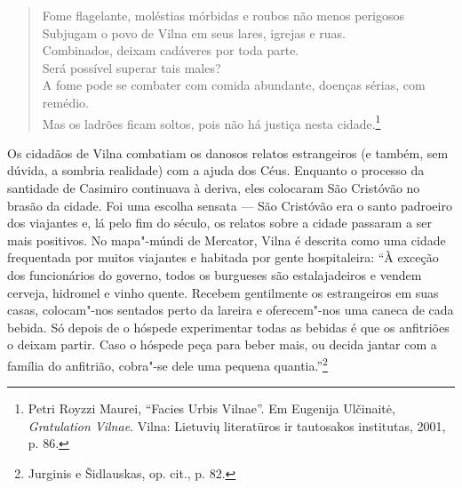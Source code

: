 \begin{verse}
Fome flagelante, moléstias mórbidas e roubos não menos perigosos\\
Subjugam o povo de Vilna em seus lares, igrejas e ruas.\\
Combinados, deixam cadáveres por toda parte.\\
Será possível superar tais males?\\
A fome pode se combater com comida abundante, doenças sérias, com
remédio.\\
Mas os ladrões ficam soltos, pois não há justiça nesta cidade.\footnote{Petri Royzzi Maurei, ``Facies Urbis Vilnae''. Em Eugenija Ulčinaitė, \textit{Gratulation Vilnae}. Vilna: Lietuvių literatūros ir tautosakos institutas, 2001, p. 86.}
\end{verse}

%

Os cidadãos de Vilna combatiam os danosos relatos estrangeiros (e
também, sem dúvida, a sombria realidade) com a ajuda dos Céus. Enquanto
o processo da santidade de Casimiro continuava à deriva, eles colocaram
São Cristóvão no brasão da cidade. Foi uma escolha sensata --- São
Cristóvão era o santo padroeiro dos viajantes e, lá pelo fim do século,
os relatos sobre a cidade passaram a ser mais positivos. No mapa"-múndi
de Mercator, Vilna é descrita como uma cidade frequentada por muitos
viajantes e habitada por gente hospitaleira: ``À exceção dos
funcionários do governo, todos os burgueses são estalajadeiros e vendem
cerveja, hidromel e vinho quente. Recebem gentilmente os estrangeiros em
suas casas, colocam"-nos sentados perto da lareira e oferecem"-nos uma
caneca de cada bebida. Só depois de o hóspede experimentar todas as
bebidas é que os anfitriões o deixam partir. Caso o hóspede peça para
beber mais, ou decida jantar com a família do anfitrião, cobra"-se dele
uma pequena quantia.''\footnote{Jurginis e Šidlauskas, op. cit., p. 82.}


